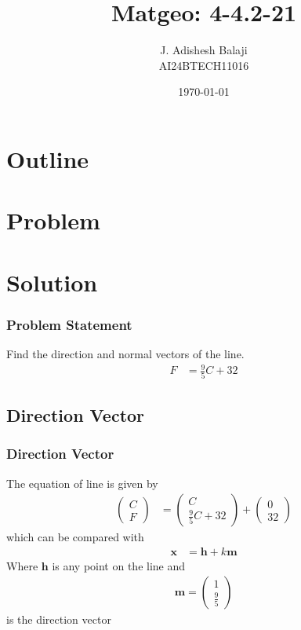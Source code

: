 \documentclass{beamer}
\title{Matgeo: 4-4.2-21}
\author{J. Adishesh Balaji \\ AI24BTECH11016}
\date{\today}
\theoremstyle{remark}
\newcommand{\myvec}[1]{\ensuremath{\begin{pmatrix}#1\end{pmatrix}}}
\let\vec\mathbf
\numberwithin{equation}{section}
\begin{document}
\begin{frame}
\titlepage
\end{frame}

\section*{Outline}
\begin{frame}
\tableofcontents
\end{frame}
\section{Problem}
\section{Solution}
\begin{frame}
\frametitle{Problem Statement}
%
Find the direction and normal vectors of the line.
\begin{align}
\label{eq:Line equation}
F &= \frac{9}{5} C + 32
\end{align}
\end{frame}


\subsection{Direction Vector}
\begin{frame}
\frametitle{Direction Vector}
The equation of line is given by \\
\begin{align}
\myvec{C \\ F} &= \myvec{C \\ \frac{9}{5}C+32} + \myvec{0 \\ 32} 
\end{align}
which can be compared with \\
        \begin{align}
            \vec{x} &= \vec{h} + k\vec{m}
        \end{align}
Where $\vec{h}$ is any point on the line and \\
        \begin{align}
        \label{eq:directionvec}
            \vec{m} = \myvec{1 \\ \frac{9}{5}}
        \end{align}
is the direction vector
\end{frame}
\end{document}
